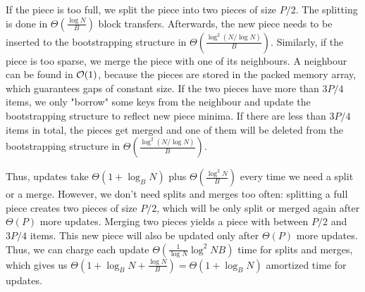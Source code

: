 If the piece is too full, we split the piece into two pieces of size
$P/2$. The splitting is done in $\Theta(\frac{\log N}{B})$ block transfers.
Afterwards, the new piece needs to be inserted to the bootstrapping structure
in $\Theta(\frac{\log^2 (N/\log N)}{B})$. Similarly, if the piece is too sparse,
we merge the piece with one of its neighbours. A neighbour can be found in
$\mathcal{O}(1)$, because the pieces are stored in the packed memory array, which
guarantees gaps of constant size. If the two pieces have more than
$3P/4$ items, we only "borrow" some keys from the neighbour and update
the bootstrapping structure to reflect new piece minima.
If there are less than $3P/4$ items in total, the pieces get merged and one
of them will be deleted from the bootstrapping structure in
$\Theta(\frac{\log^2 (N/\log N)}{B})$.

Thus, updates take $\Theta(1+\log_B N)$ plus $\Theta(\frac{\log^2 N}{B})$
every time we need a split or a merge. However, we don't need splits and
merges too often: splitting a full piece creates two pieces of size $P/2$,
which will be only split or merged again after $\Theta(P)$ more updates.
Merging two pieces yields a piece with between $P/2$ and $3P/4$ items.
This new piece will also be updated only after $\Theta(P)$ more updates.
Thus, we can charge each update $\Theta(\frac{1}{\log N}{\log^2 N}{B})$
time for splits and merges, which gives us $\Theta(1+\log_B N+\frac{\log N}{B})=
\Theta(1+\log_B N)$ amortized time for updates.
